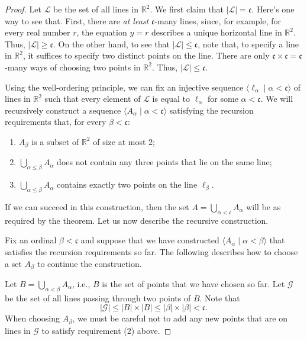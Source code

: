 \documentclass[a4paper]{memoir}
\theoremstyle{definition}
\newcommand{\bb}{\mathbb}
\newcommand{\mc}{\mathcal}
\begin{document}
\begin{proof}
  Let $\mathcal{L}$ be the set of all lines in $\bb{R}^2$. We first claim that $|\mc{L}| = \mathfrak{c}$.
  Here's one way to see that. First, there are \emph{at least} $\mathfrak{c}$-many lines, since, for 
  example, for every real number $r$, the equation $y = r$ describes a unique horizontal line in 
  $\mathbb{R}^2$. Thus, $|\mc{L}| \geq \mathfrak{c}$. On the other hand, to see that 
  $|\mc{L}| \leq \mathfrak{c}$, note that, to specify a line in $\bb{R}^2$, it suffices to specify 
  two distinct points on the line. There are only $\mathfrak{c} \times \mathfrak{c} = \mathfrak{c}$-many 
  ways of choosing two points in $\bb{R}^2$. Thus, $|\mathcal{L}| \leq \mathfrak{c}$.
  
  Using the well-ordering principle, we can fix an injective sequence $\langle \ell_\alpha \mid 
  \alpha < \mathfrak{c} \rangle$ of lines in $\bb{R}^2$ such that every element of $\mc{L}$ is equal 
  to $\ell_\alpha$ for some $\alpha < \mathfrak{c}$. We will recursively construct a sequence 
  $\langle A_\alpha \mid \alpha < \mathfrak{c} \rangle$ satisfying the recursion requirements 
  that, for every $\beta < \mathfrak{c}$:
  \begin{enumerate}
    \item $A_\beta$ is a subset of $\bb{R}^2$ of size at most 2;
    \item $\bigcup_{\alpha \leq \beta} A_\alpha$ does not contain any three points that lie on the 
    same line;
    \item $\bigcup_{\alpha \leq \beta} A_\alpha$ contains exactly two points on the line 
    $\ell_\beta$.
  \end{enumerate}
  If we can succeed in this construction, then the set $A = \bigcup_{\alpha < \mathfrak{c}} A_\alpha$ 
  will be as required by the theorem. Let us now describe the recursive construction.
  
  Fix an ordinal $\beta < \mathfrak{c}$ and suppose that we have constructed 
  $\langle A_\alpha \mid \alpha < \beta \rangle$ that satisfies the recursion requirements so far.
  The following describes how to choose a set $A_\beta$ to continue the construction.
  
  Let $B = \bigcup_{\alpha < \beta} A_\alpha$, i.e., $B$ is the set of points that we have chosen 
  so far. Let $\mathcal{G}$ be the set of all lines passing through two points of $B$. Note 
  that 
  \[ 
    |\mathcal{G}| \leq |B| \times |B| \leq |\beta| \times |\beta| < \mathfrak{c}.
  \]
  When choosing $A_\beta$, we must be careful not to add any new points that are on lines in 
  $\mathcal{G}$ to satisfy requirement (2) above.
  

\end{proof}
\end{document}
